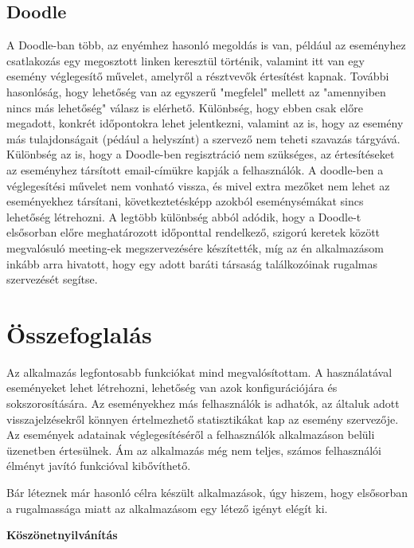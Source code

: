 \documentclass[a4paper,12pt]{report}
\theoremstyle{definition}
\theoremstyle{remark}
\begin{document}
\section{Doodle}

A Doodle-ban több, az enyémhez hasonló megoldás is van, például az eseményhez csatlakozás egy megosztott linken keresztül történik, valamint itt van egy esemény véglegesítő művelet, amelyről a résztvevők értesítést kapnak.  További hasonlóság, hogy lehetőség van az egyszerű "megfelel" mellett az "amennyiben nincs más lehetőség" válasz is elérhető. Különbség, hogy ebben csak előre megadott, konkrét időpontokra lehet jelentkezni, valamint az is, hogy az esemény más tulajdonságait (pédául a helyszínt) a szervező nem teheti szavazás tárgyává. Különbség az is, hogy a Doodle-ben regisztráció nem szükséges, az értesítéseket az eseményhez társított email-címükre kapják a felhasználók. A doodle-ben a véglegesítési művelet nem vonható vissza, és mivel extra mezőket nem lehet az eseményekhez társítani, következtetésképp azokból eseménysémákat sincs lehetőség létrehozni. A legtöbb különbség abból adódik, hogy a Doodle-t elsősorban előre meghatározott időponttal rendelkező, szigorú keretek között megvalósuló meeting-ek megszervezésére készítették, míg az én alkalmazásom inkább arra hivatott, hogy egy adott baráti társaság találkozóinak rugalmas szervezését segítse.

\chapter{Összefoglalás}

Az alkalmazás legfontosabb funkciókat mind megvalósítottam. A használatával eseményeket lehet létrehozni, lehetőség van azok konfigurációjára és sokszorosítására. Az eseményekhez más felhasználók is adhatók, az általuk adott visszajelzésekről könnyen értelmezhető statisztikákat kap az esemény szervezője. Az események adatainak véglegesítéséről a felhasználók alkalmazáson belüli üzenetben értesülnek. Ám az alkalmazás még nem teljes, számos felhasználói élményt javító funkcióval kibővíthető.

Bár léteznek már hasonló célra készült alkalmazások, úgy hiszem, hogy elsősorban a rugalmassága miatt az alkalmazásom egy létező igényt elégít ki.

\newpage


 

\newpage
{\Huge \bf Köszönetnyilvánítás}
\end{document}
